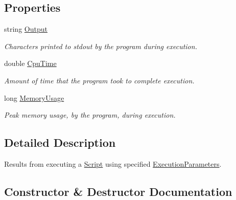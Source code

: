 \subsection*{Properties}
\begin{DoxyCompactItemize}
\item 
string \mbox{\hyperlink{class_code_a_friend_1_1_data_model_1_1_script_evaluation_ad90120cfe537b3a21bfc497d544eb0e9}{Output}}
\begin{DoxyCompactList}\small\item\em Characters printed to stdout by the program during execution. \end{DoxyCompactList}\item 
double \mbox{\hyperlink{class_code_a_friend_1_1_data_model_1_1_script_evaluation_af4aa3fb175cd5fc2d6998c4690f5085e}{Cpu\+Time}}
\begin{DoxyCompactList}\small\item\em Amount of time that the program took to complete execution. \end{DoxyCompactList}\item 
long \mbox{\hyperlink{class_code_a_friend_1_1_data_model_1_1_script_evaluation_a7a256f081758e46dabfbf3fae1c71817}{Memory\+Usage}}
\begin{DoxyCompactList}\small\item\em Peak memory usage, by the program, during execution. \end{DoxyCompactList}\end{DoxyCompactItemize}


\subsection{Detailed Description}
Results from executing a \mbox{\hyperlink{class_code_a_friend_1_1_data_model_1_1_script}{Script}} using specified \mbox{\hyperlink{class_code_a_friend_1_1_data_model_1_1_execution_parameters}{Execution\+Parameters}}. 



\subsection{Constructor \& Destructor Documentation}
\mbox{\label{class_code_a_friend_1_1_data_model_1_1_script_evaluation_abd3a2ec93bde80977a8c2b6609178a88}} 
